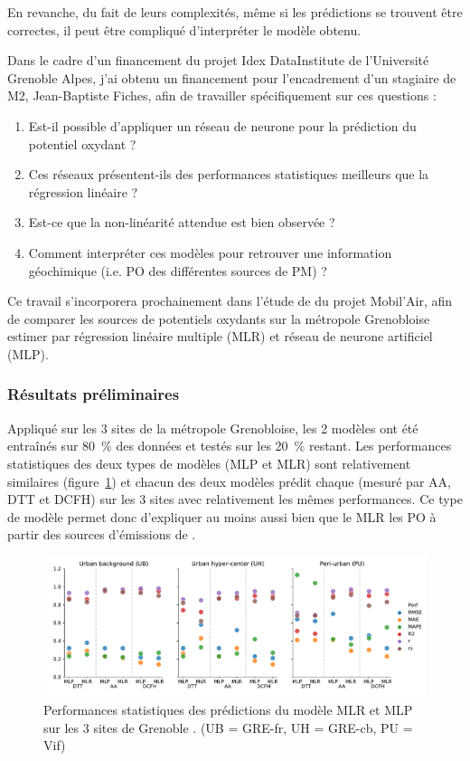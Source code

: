 En revanche, du fait de leurs complexités, même si les prédictions se trouvent être
correctes, il peut être compliqué d'interpréter le modèle obtenu.


Dans le cadre d'un financement du projet Idex DataInstitute de l'Université Grenoble Alpes, j'ai
obtenu un financement pour l'encadrement d'un stagiaire de M2, Jean-Baptiste Fiches, afin
de travailler spécifiquement sur ces questions :
\begin{enumerate}
    \item Est-il possible d'appliquer un réseau de neurone pour la prédiction du potentiel
        oxydant ?
    \item Ces réseaux présentent-ils des performances statistiques meilleurs que la
        régression linéaire ?
    \item Est-ce que la non-linéarité attendue est bien observée ?
    \item Comment interpréter ces modèles pour retrouver une information géochimique (i.e.
        PO des différentes sources de PM) ?
\end{enumerate}
Ce travail s'incorporera prochainement dans l'étude de \cite{borlazaUrbaninprep.} du
projet Mobil'Air, afin de comparer les sources de potentiels oxydants sur la
métropole Grenobloise estimer par régression linéaire multiple (MLR) et réseau de neurone
artificiel (MLP).


\subsubsection{Résultats préliminaires}%
\label{ssub:résultats_préliminaires}

Appliqué sur les 3 sites de la métropole Grenobloise, les 2 modèles ont été entraînés sur
\SI{80}{\percent} des données et testés sur les \SI{20}{\percent} restant. Les performances
statistiques des deux types de modèles (MLP et MLR) sont relativement
similaires (figure~\ref{fig:perfMLPMLR}) et chacun des deux modèles prédit chaque \POv{}
(mesuré par AA, DTT et DCFH) sur les 3 sites avec relativement les mêmes performances.
Ce type de modèle permet donc d'expliquer au moins aussi bien que le MLR les PO à partir
des sources d'émissions de \PMdix.

\begin{figure}[ht]
    \centering
    \includegraphics[width=1.0\linewidth]{figures/chapter05/perfMLPMLR.pdf}
    \caption{Performances statistiques des prédictions du modèle MLR et MLP sur les 3
    sites de Grenoble \autocite{borlazaUrbaninprep.}. (UB = GRE-fr, UH = GRE-cb, PU = Vif)}%
    \label{fig:perfMLPMLR}
\end{figure}

